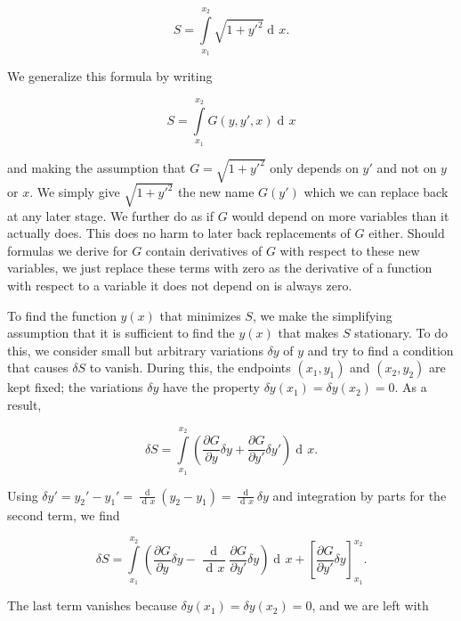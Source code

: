 \documentclass[prb,preprint]{revtex4-1}
\DeclareMathOperator{\dd}{d\!}
\DeclareMathOperator{\ddd}{\mathrm{d}}
\begin{document}
\begin{equation}
S = \int\limits_{x_1}^{x_2}\sqrt{1 + y'^2} \dd x.
\end{equation}

We generalize this formula by writing

\begin{equation}
S=\int\limits_{x_1}^{x_2} G(y,y',x) \dd x
\end{equation}



and making the assumption that $G = \sqrt{1 + y'^2}$ only depends on $y'$ and not on $y$ or $x$. We simply give $\sqrt{1+y'^2}$ the new name $G(y')$ which we can replace back at any later stage. We further do as if $G$ would depend on more variables than it actually does. This does no harm to later back replacements of $G$ either. Should formulas we derive for $G$ contain derivatives of $G$ with respect to these new variables, we just replace these terms with zero as the derivative of a function with respect to a variable it does not depend on is always zero. %

To find the function $y(x)$ that minimizes $S$, we make the simplifying assumption that it is sufficient to find the $y(x)$ that makes $S$ stationary. To do this, we consider small but arbitrary variations $\delta y$ of $y$ and try to find a condition that causes $\delta S$ to vanish. During this, the endpoints $(x_1,y_1)$ and $(x_2,y_2)$ are kept fixed; the variations $\delta y$ have the property $\delta y(x_1) = \delta y(x_2) = 0$. As a result,

\begin{equation}
\delta S = \int\limits_{x_1}^{x_2} \left(\frac{\partial G}{\partial y} \delta y
+ \frac{\partial G}{\partial y'} \delta y' \right) \dd x.
\end{equation}

Using $\delta y' = y_2' - y_1' = \frac{\ddd }{\dd x}(y_2 - y_1) = \frac{\ddd}{\dd x} \delta y$ and integration by parts for the second term, we find

\begin{equation}
\delta S = \int\limits_{x_1}^{x_2} \left( \frac{\partial G}{\partial y} \delta y
- \frac{\ddd}{\dd x}\frac{\partial G}{\partial y'} \delta y \right) \dd x
+ \left[\frac{\partial G}{\partial y'} \delta y \right]_{x_1}^{x_2}.
\end{equation}

The last term vanishes because $\delta y(x_1) = \delta y(x_2) = 0$, and we are left with
\end{document}
